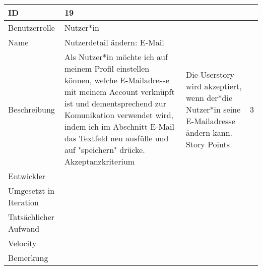 \begin{tabularx}{\textwidth}{|p{}|X|}
	\hline
	ID & 19\\
	\hline
	Benutzerrolle & Nutzer*in\\
	\hline
	Name & Nutzerdetail ändern: E-Mail\\
	\hline
	Beschreibung & Als Nutzer*in möchte ich auf meinem Profil einstellen können, welche E-Mailadresse mit meinem Account verknüpft ist und dementsprechend zur Komunikation verwendet wird, indem ich im Abschnitt E-Mail das Textfeld neu ausfülle und auf "speichern" drücke.
	\hline
	Akzeptanzkriterium & Die Userstory wird akzeptiert, wenn der*die Nutzer*in seine E-Mailadresse ändern kann.
	\hline
	Story Points & 3\\
	\hline
	Entwickler & \\
	\hline
	Umgesetzt in Iteration & \\ 
	\hline
	Tatsächlicher Aufwand & \\
	\hline
	Velocity & \\
	\hline
	Bemerkung & \\
	\hline
\end{tabularx}
\vspace{20pt}
